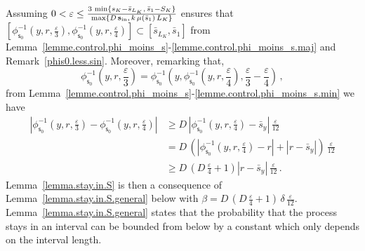 \documentclass[10pt]{amsart}
\theoremstyle{definition}\newtheorem{defi}[theo]{Definition}\newtheorem{rema}[theo]{Remark}\newtheorem{exam}[theo]{Example}\newtheorem{exem}[theo]{Example}\newtheorem{nota}[theo]{Notation}
\newcommand{\Sin}{{\mathbf s}_{\textrm{\tiny\rm in}}}
\newcommand{\SminK}{s_K}
\newcommand{\SmaxK}{S_K}
\newcommand{\barmu}{\mu(\bar s_1)}
\newcommand{\phis}{\phi_{\textsf{s}_0}^{-1}}
\newcommand{\lmax}{{L_K}}
\newcommand{\1}{\mathbf{1}}
\begin{document}
Assuming $0<\varepsilon\leq \frac{3\,\min\{\SminK-\bar s_{\lmax},\, \bar s_1-\SmaxK\}}{\max\{D\,\Sin,\, k\,\barmu\,\lmax\}}$ ensures that $[\phis(y,r,\frac{\varepsilon}{3}),\phis(y,r,\frac{\varepsilon}{4})]\subset [\bar s_{\lmax}, \bar s_1]$ from Lemma~\ref{lemme.control.phi_moins_s}-\ref{lemme.control.phi_moins_s.maj} and Remark~\ref{phis0.less.sin}. Moreover, remarking that,
\[
\phis\left(y,r, \frac{\varepsilon}{3}\right) = \phis\left(y,\phis\left(y,r, \frac{\varepsilon}{4}\right), \frac{\varepsilon}{3}-\frac{\varepsilon}{4}\right)\,,
\]
from Lemma~\ref{lemme.control.phi_moins_s}-\ref{lemme.control.phi_moins_s.min} we have
\begin{align*}
\left|\phis\left(y, r, \frac{\varepsilon}{3}\right) - \phis\left(y, r, \frac{\varepsilon}{4}\right)\right| & \geq D\,\left|\phis\left(y,r, \frac{\varepsilon}{4}\right) - \bar s_y\right|\,\frac{\varepsilon}{12}
\\
& = D\,\left(\left|\phis\left(y,r, \frac{\varepsilon}{4}\right) - r\right| + |r- \bar s_y|\right)\,\frac{\varepsilon}{12}
\\
& \geq D\,\left(D\,\frac{\varepsilon}{4}+1\right)|r- \bar s_y|\,\frac{\varepsilon}{12}\,.
\end{align*}
Lemma~\ref{lemma.stay.in.S} is then a consequence of Lemma~\ref{lemma.stay.in.S.general} below with $\beta= D\,(D\,\frac{\varepsilon}{4}+1)\,\delta\,\frac{\varepsilon}{12}$. Lemma~\ref{lemma.stay.in.S.general} states that the probability that the process stays in an interval can be bounded from below by a constant which only depends on the interval length.
\end{document}
